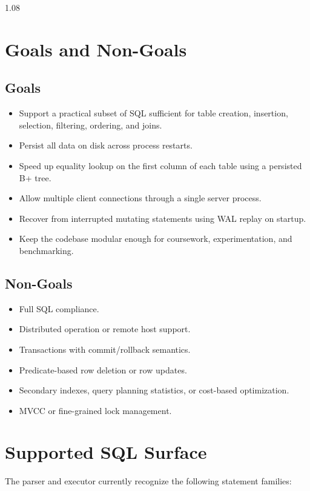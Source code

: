 \documentclass[11pt,a4paper]{article}
\begin{document}
\begin{spacing}{1.08}
\section{Goals and Non-Goals}

\subsection{Goals}

\begin{itemize}
    \item Support a practical subset of SQL sufficient for table creation, insertion, selection, filtering, ordering, and joins.
    \item Persist all data on disk across process restarts.
    \item Speed up equality lookup on the first column of each table using a persisted B+ tree.
    \item Allow multiple client connections through a single server process.
    \item Recover from interrupted mutating statements using WAL replay on startup.
    \item Keep the codebase modular enough for coursework, experimentation, and benchmarking.
\end{itemize}

\subsection{Non-Goals}

\begin{itemize}
    \item Full SQL compliance.
    \item Distributed operation or remote host support.
    \item Transactions with commit/rollback semantics.
    \item Predicate-based row deletion or row updates.
    \item Secondary indexes, query planning statistics, or cost-based optimization.
    \item MVCC or fine-grained lock management.
\end{itemize}

\section{Supported SQL Surface}

The parser and executor currently recognize the following statement families:


\end{spacing}
\end{document}
